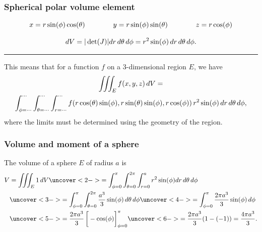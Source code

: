 \documentclass[9pt]{beamer}
\begin{document}
\begin{frame}[t]
 \frametitle{Spherical polar volume element}

 \[ x=r\sin(\phi)\cos(\theta) \hspace{4em}
    y=r\sin(\phi)\sin(\theta) \hspace{4em}
    z=r\cos(\phi)
 \]

 \[ dV = |\det(J)| dr\,d\theta\,d\phi = r^2\sin(\phi)\,dr\,d\theta\,d\phi. \]

 \hrule\vspace{3ex}

 This means that for a function $f$ on a $3$-dimensional region $E$, we
 have
 \begin{multline*}
   \iiint_E f(x,y,z)\,dV = \\ 
     \int_{\phi=\dotsb}^{\dotsb}\int_{\theta=\dotsb}^{\dotsb}\int_{r=\dotsb}^{\dotsb}
      f(r\cos(\theta)\sin(\phi),r\sin(\theta)\sin(\phi),r\cos(\phi))
       \,r^2\sin(\phi)\,dr\,d\theta\,d\phi,
 \end{multline*}
 where the limits must be determined using the geometry of the region.

\end{frame}

\begin{frame}[t]
 \frametitle{Volume and  moment of a sphere}
 
 The volume of a sphere $E$ of radius $a$ is 
 \begin{align*}
  V &= \iiint_E 1\,dV 
     \uc<2->{= \int_{\phi=0}^\pi \int_{\tht=0}^{2\pi} \int_{r=0}^a 
        r^2\sin(\phi) dr\,d\tht\,d\phi} \\
    &\uc<3->{= \int_{\phi=0}^\pi \int_{\tht=0}^{2\pi}
        \frac{a^3}{3} \sin(\phi)\,d\tht\,d\phi }
     \uc<4->{= \int_{\phi=0}^\pi \frac{2\pi a^3}{3} \sin(\phi)\,d\phi} \\
    &\uc<5->{= \frac{2\pi a^3}{3} \CH{-\cos(\phi)}_{\phi=0}^\pi }
     \uc<6->{= \frac{2\pi a^3}{3} (1-(-1)) = \frac{4\pi a^3}{3}.}
 \end{align*}
\end{frame}
\end{document}
